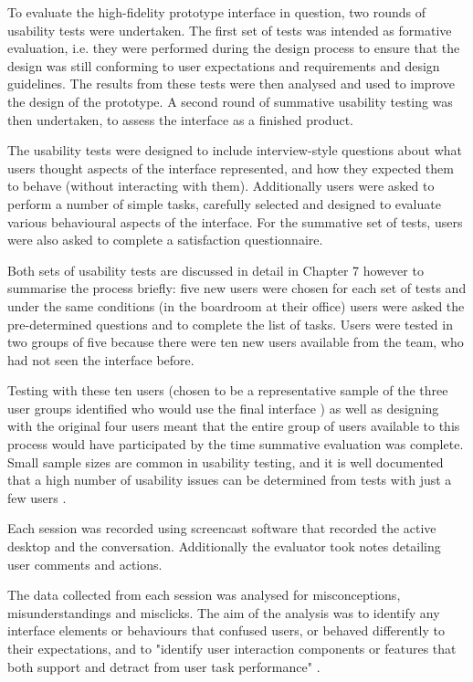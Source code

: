 To evaluate the high-fidelity prototype interface in question, two rounds of usability tests were undertaken. The first set of tests was intended as formative evaluation, i.e. they were performed during the design process to ensure that the design was still conforming to user expectations and requirements \citep[p. 437]{RogersPreece} and design guidelines. The results from these tests were then analysed and used to improve the design of the prototype. A second round of summative usability testing was then undertaken, to assess the interface as a finished product. 

The usability tests were designed to include interview-style questions about what users thought aspects of the interface represented, and how they expected them to behave (without interacting with them). Additionally users were asked to perform a number of simple tasks, carefully selected and designed to evaluate various behavioural aspects of the interface. For the summative set of tests, users were also asked to complete a satisfaction questionnaire. 

Both sets of usability tests are discussed in detail in Chapter 7 however to summarise the process briefly: five new users were chosen for each set of tests and under the same conditions (in the boardroom at their office) users were asked the pre-determined questions and to complete the list of tasks. Users were tested in two groups of five because there were ten new users available from the team, who had not seen the interface before. 

Testing with these ten users (chosen to be a representative sample of the three user groups identified who would use the final interface \citep[p. 461]{RogersPreece}) as well as designing with the original four users meant that the entire group of users available to this process would have participated by the time summative evaluation was complete. Small sample sizes are common in usability testing, and it is well documented that a high number of usability issues can be determined from tests with just a few users \citep[p. 119]{HackosRedish}.

Each session was recorded using screencast software that recorded the active desktop and the conversation. Additionally the evaluator took notes detailing user comments and actions. 

The data collected from each session was analysed for misconceptions, misunderstandings and misclicks. The aim of the analysis was to identify any interface elements or behaviours that confused users, or behaved differently to their expectations, and to "identify user interaction components or features that both support and detract from user task performance" \citep{GabbardHix}.

